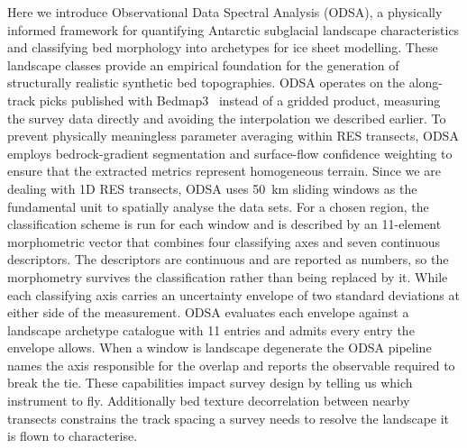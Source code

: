 Here we introduce Observational Data Spectral Analysis (ODSA), a physically informed framework for quantifying Antarctic subglacial landscape characteristics and classifying bed morphology into archetypes for ice sheet modelling. These landscape classes provide an empirical foundation for the generation of structurally realistic synthetic bed topographies. ODSA operates on the along-track picks published with Bedmap3~\cite{Pritchard_2025} instead of a gridded product, measuring the survey data directly and avoiding the interpolation we described earlier. To prevent physically meaningless parameter averaging within RES transects, ODSA employs bedrock-gradient segmentation and surface-flow confidence weighting to ensure that the extracted metrics represent homogeneous terrain. Since we are dealing with 1D RES transects, ODSA uses 50~km sliding windows as the fundamental unit to spatially analyse the data sets. For a chosen region, the classification scheme is run for each window and is described by an 11-element morphometric vector that combines four classifying axes and seven continuous descriptors. The descriptors are continuous and are reported as numbers, so the morphometry survives the classification rather than being replaced by it. While each classifying axis carries an uncertainty envelope of two standard deviations at either side of the measurement. ODSA evaluates each envelope against a landscape archetype catalogue with 11 entries and admits every entry the envelope allows. When a window is landscape degenerate the ODSA pipeline names the axis responsible for the overlap and reports the observable required to break the tie. These capabilities impact survey design by telling us which instrument to fly. Additionally bed texture decorrelation between nearby transects constrains the track spacing a survey needs to resolve the landscape it is flown to characterise. 